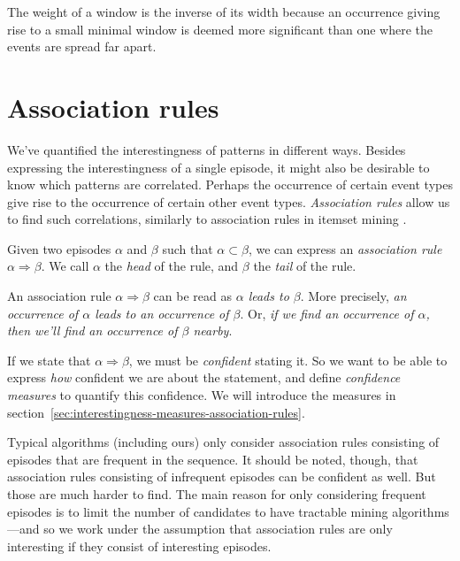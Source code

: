 The weight of a window is the inverse of its width because an occurrence giving rise to a small minimal window is deemed more significant than one where the events are spread far apart.



\section{Association rules}

We've quantified the interestingness of patterns in different ways. Besides expressing the interestingness of a single episode, it might also be desirable to know which patterns are correlated. Perhaps the occurrence of certain event types give rise to the occurrence of certain other event types. \emph{Association rules} allow us to find such correlations, similarly to association rules in itemset mining \citep{piatetsky1991discovery}.


\begin{definition}
Given two episodes $ \alpha $ and $ \beta $ such that $ \alpha \subset \beta $, we can express an \emph{association rule} $ \alpha \Rightarrow \beta $. We call $ \alpha $ the \emph{head} of the rule, and $ \beta $ the \emph{tail} of the rule.
\end{definition}

An association rule $ \alpha \Rightarrow \beta $ can be read as \emph{$ \alpha $ leads to $ \beta $}. More precisely, \emph{an occurrence of $ \alpha $ leads to an occurrence of $ \beta $}. Or, \emph{if we find an occurrence of $ \alpha $, then we'll find an occurrence of $ \beta $ nearby}.

If we state that $ \alpha \Rightarrow \beta $, we must be \emph{confident} stating it. So we want to be able to express \emph{how} confident we are about the statement, and define \emph{confidence measures} to quantify this confidence. We will introduce the measures in section~\ref{sec:interestingness-measures-association-rules}.

Typical algorithms (including ours) only consider association rules consisting of episodes that are frequent in the sequence. It should be noted, though, that association rules consisting of infrequent episodes can be confident as well. But those are much harder to find. The main reason for only considering frequent episodes is to limit the number of candidates to have tractable mining algorithms---and so we work under the assumption that association rules are only interesting if they consist of interesting episodes.


